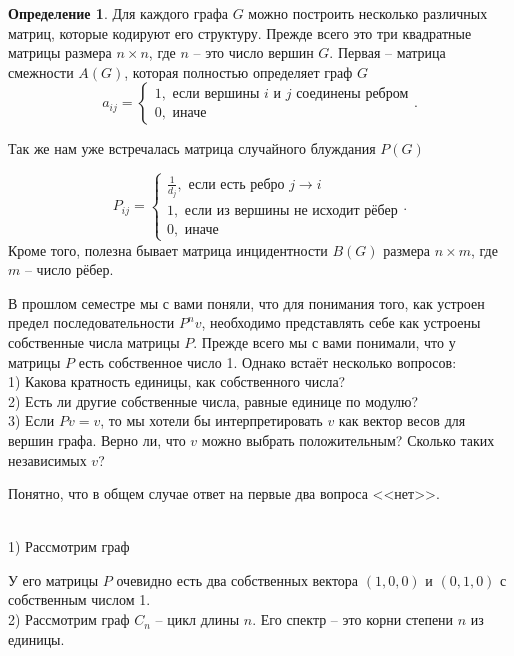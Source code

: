 \documentclass[10pt,a4paper,oneside]{book}
\theoremstyle{definition}
\newtheorem*{defn}{Определение}
\def\exm{\noindent {\bf Примеры:}}
\def\dfn{\begin{defn}}
\def\edfn{\end{defn}}
\begin{document}
\dfn
Для каждого графа $G$ можно построить  несколько  различных матриц, которые кодируют его структуру. Прежде всего это три квадратные матрицы  размера $n\times n$, где $n$ -- это число вершин $G$. 
Первая -- матрица смежности  $A(G)$, которая полностью определяет граф $G$
$$a_{ij}=\begin{cases} 1, \text{ если вершины $i$ и $j$ соединены ребром}\\
0, \text{ иначе }
\end{cases}.$$

Так же нам уже встречалась матрица случайного блуждания  $P(G)$

$$P_{ij}=\begin{cases}
\frac{1}{d_j}, \text{ если есть ребро $j\to i$}\\
1, \text{ если из вершины не исходит рёбер} \\
0, \text{ иначе }
\end{cases}.$$
Кроме того, полезна бывает матрица инцидентности $B(G)$ размера $n\times m$, где $m$ -- число рёбер.
\edfn

В прошлом семестре мы с вами поняли, что для понимания того, как устроен предел последовательности $P^nv$, необходимо представлять себе как устроены собственные числа матрицы $P$. Прежде всего мы с вами понимали, что у матрицы $P$ есть собственное число 1. Однако встаёт несколько вопросов:\\
1) Какова кратность единицы, как собственного числа?\\
2) Есть ли другие собственные числа, равные единице по модулю?\\
3) Если $Pv=v$, то мы хотели бы интерпретировать $v$ как вектор весов для вершин графа. Верно ли, что $v$ можно выбрать положительным? Сколько таких независимых $v$?

Понятно, что в общем случае ответ на первые два вопроса <<нет>>.

\exm \\
1) Рассмотрим граф 
\begin{center}
\end{center}
У его матрицы $P$ очевидно есть два собственных вектора $(1,0,0)$ и $(0,1,0)$ с собственным числом 1.\\
2) Рассмотрим граф $C_n$ -- цикл длины $n$. Его спектр -- это корни степени $n$ из единицы.\\
\end{document}
